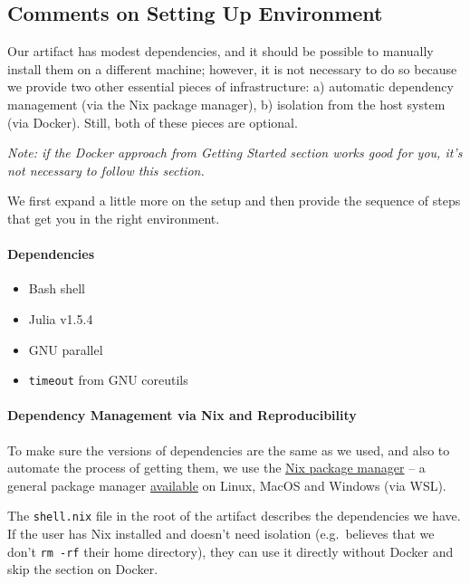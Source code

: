 \documentclass[
]{article}
\begin{document}
\hypertarget{comments-on-setting-up-environment}{%
\subsection{Comments on Setting Up
Environment}\label{comments-on-setting-up-environment}}

Our artifact has modest dependencies, and it should be possible to
manually install them on a different machine; however, it is not necessary
to do so because we provide two other essential
pieces of infrastructure: a) automatic dependency management (via the
Nix package manager), b) isolation from the host system (via Docker).
Still, both of these pieces are optional.

\textit{Note: if the Docker approach from Getting Started section works good for
you, it's not necessary to follow this section.}

We first expand a little more on the setup and then provide the sequence
of steps that get you in the right environment.

\hypertarget{dependencies}{%
\paragraph{Dependencies}\label{dependencies}}

\begin{itemize}
\item
  Bash shell
\item
  Julia v1.5.4
\item
  GNU parallel
\item
  \texttt{timeout} from GNU coreutils
\end{itemize}

\hypertarget{dependency-management-via-nix-and-reproducibility}{%
\paragraph{Dependency Management via Nix and
Reproducibility}\label{dependency-management-via-nix-and-reproducibility}}

To make sure the versions of dependencies are the same as we used, and
also to automate the process of getting them, we use the
\href{https://nixos.org/manual/nix/stable/\#chap-introduction}{Nix
package manager} -- a general package manager
\href{https://nixos.org/guides/install-nix.html}{available} on Linux,
MacOS and Windows (via WSL).

The \texttt{shell.nix} file in the root of the artifact describes the
dependencies we have. If the user has Nix installed and doesn't need
isolation (e.g.~believes that we don't \texttt{rm\ -rf} their home
directory), they can use it directly without Docker and skip the
section on Docker.
\end{document}
